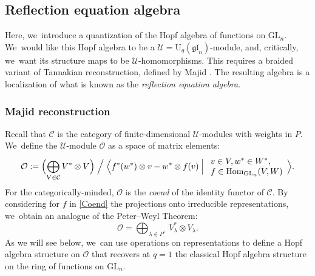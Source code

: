 \documentclass[JEP,XML,SOM,Unicode,published]{cedram}
\newcommand{\GL}{\mathrm{GL}}
\newcommand{\rU}{\mathrm{U}}
\theoremstyle{definition}
\newcommand{\OO}{\mathcal{O}}
\newcommand{\UU}{\mathcal{U}}
\begin{document}
\subsection{Reflection equation algebra}
Here, we~introduce a quantization of the Hopf algebra of functions on $\GL_n$. We~would like this Hopf algebra to be a $\mathcal{U}=\rU_q(\mathfrak{gl}_n)$-module, and, critically, we~want its structure maps to be $\UU$-homomorphisms.
This requires a braided variant of Tannakian reconstruction, defined by Majid \cite{MajidBraided}.
The resulting algebra is a localization of what is known as the \textit{reflection equation algebra}.

\subsubsection{Majid reconstruction}
Recall that $\mathcal{C}$ is the category of finite-dimensional $\UU$-modules with weights in $P$. We~define the $\UU$-module $\OO$ as a space of matrix elements:
\begin{equation}
\OO:=\Bigl(\bigoplus_{V\in\mathcal{C}}V^*\otimes V \Bigr)\Bigm/\Bigl\langle f^*(w^*)\otimes v-w^*\otimes f(v)\Bigm|
\begin{array}{l}
v\in V, w^*\in W^*,\\
f\in\mathrm{Hom}_{\GL_n}(V,W)
\end{array}
\Bigr\rangle.
\label{Coend}
\end{equation}
For the categorically-minded, $\OO$ is the \textit{coend} of the identity functor of $\mathcal{C}$.
By considering for $f$ in \eqref{Coend} the projections onto irreducible representations, we~obtain an analogue of the Peter--Weyl Theorem:
\begin{equation}
\OO=\bigoplus_{\lambda\in P^+} V_\lambda^*\otimes V_\lambda.
\label{qPeterWeyl}
\end{equation}
As we will see below, we~can use operations on representations to define a Hopf algebra structure on $\OO$ that recovers at $q=1$ the classical Hopf algebra structure on the ring of functions on $\GL_n$.
\end{document}
